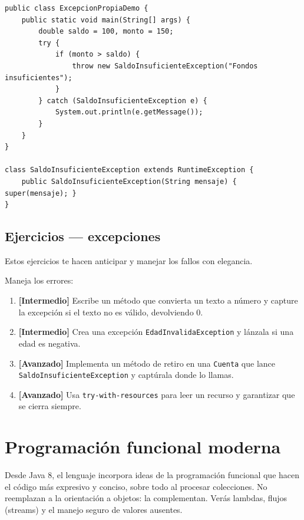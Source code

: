 \documentclass[11pt]{article}
\begin{document}
\begin{cajacodigo}
\begin{lstlisting}[style=java]
public class ExcepcionPropiaDemo {
    public static void main(String[] args) {
        double saldo = 100, monto = 150;
        try {
            if (monto > saldo) {
                throw new SaldoInsuficienteException("Fondos insuficientes");
            }
        } catch (SaldoInsuficienteException e) {
            System.out.println(e.getMessage());
        }
    }
}

class SaldoInsuficienteException extends RuntimeException {
    public SaldoInsuficienteException(String mensaje) { super(mensaje); }
}
\end{lstlisting}
\end{cajacodigo}
\vspace{2pt}
\subsection{Ejercicios — excepciones}
Estos ejercicios te hacen anticipar y manejar los fallos con elegancia.

Maneja los errores:

\begin{enumerate}[leftmargin=1.7em,itemsep=3pt,topsep=2pt]
\item \textbf{[Intermedio]} Escribe un método que convierta un texto a número y capture la excepción si el texto no es válido, devolviendo 0.
\item \textbf{[Intermedio]} Crea una excepción \texttt{Edad\allowbreak{}Invalida\allowbreak{}Exception} y lánzala si una edad es negativa.
\item \textbf{[Avanzado]} Implementa un método de retiro en una \texttt{Cuenta} que lance \texttt{Saldo\allowbreak{}Insuficiente\allowbreak{}Exception} y captúrala donde lo llamas.
\item \textbf{[Avanzado]} Usa \texttt{try-with-resources} para leer un recurso y garantizar que se cierra siempre.
\end{enumerate}
\section{Programación funcional moderna}
Desde Java 8, el lenguaje incorpora ideas de la programación funcional que hacen el código más expresivo y conciso, sobre todo al procesar colecciones. No reemplazan a la orientación a objetos: la complementan. Verás lambdas, flujos (streams) y el manejo seguro de valores ausentes.
\end{document}
